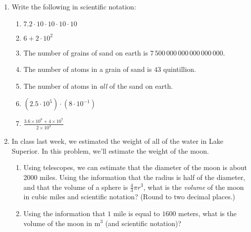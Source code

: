 \documentclass[12 pt]{article}
\begin{document}
\begin{enumerate}
\begin{enumerate}
    \end{enumerate}
		\pagebreak
		\item
      Write the following in scientific notation: \begin{enumerate}
        \item $7.2 \cdot 10 \cdot 10 \cdot 10 \cdot 10$
        \\ \vspace{2cm}
        \item $6 + 2\cdot 10^2$
        \\ \vspace{2cm}
        \item The number of grains of sand on earth is $7\,500\,000\,000\,000\,000\,000$.
        \\ \vspace{2cm}
        \item The number of atoms in a grain of sand is $43$ quintillion.
        \\ \vspace{2cm}
        \item The number of atoms in \textit{all} of the sand on earth.
        \\ \vspace{2cm}
        \item $(2.5 \cdot 10^5) \cdot (8 \cdot 10^{-1})$
        \\ \vspace{2cm}
        \item $\displaystyle \frac{3.6 \times 10^8 + 4 \times 10^7}{2 \times 10^3}$
      \end{enumerate}
      \pagebreak
    \item In class last week, we estimated the weight of all of the water in Lake Superior. In this problem, we'll estimate the weight of the moon.
    \begin{enumerate}
      \item Using telescopes, we can estimate that the diameter of the moon is about 2000 miles. Using the information that the radius is half of the diameter, and that the volume of a sphere is $\frac 43 \pi r^3$, what is the \textit{volume} of the moon in cubic miles and scientific notation? (Round to two decimal places.)
      \\ \vspace{3cm}
      \item Using the information that $1$ mile is equal to $1600$ meters, what is the volume of the moon in $\text{m}^3$ (and scientific notation)? \\

\end{enumerate}
\end{enumerate}
\end{document}
